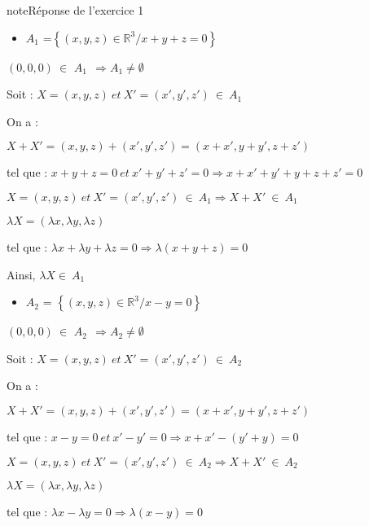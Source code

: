 \documentclass[letterpaper,10pt,french]{jupyterBook}
\begin{document}
\begin{sphinxadmonition}{note}{Réponse de l’exercice 1}
\begin{itemize}
\item {} 
\sphinxAtStartPar
\(A_1\) =\( \left\{ (x,y,z) \in \mathbb{R}^3 / x+y+z = 0 \right\}\)

\end{itemize}

\sphinxAtStartPar
\((0,0,0) ~\in\) \(A_1 ~~ \Rightarrow A_1 \neq  \emptyset\)

\sphinxAtStartPar
Soit :  \(X=(x,y,z) ~ et~ X'= (x',y',z') ~ \in ~A_1\)

\sphinxAtStartPar
On a :

\sphinxAtStartPar
\(X+ X' = (x,y,z) + (x',y',z') = (x+x',y+y',z+z')\)

\sphinxAtStartPar
tel que : \(x+y+z = 0 ~et~ x'+y'+z' = 0 \Rightarrow x+x'+y'+ y+ z +z' = 0 \)

\sphinxAtStartPar
\(X=(x,y,z) ~ et~ X'= (x',y',z') ~ \in ~A_1 \Rightarrow X+ X'~ \in ~A_1\)

\sphinxAtStartPar
\(\lambda X = (\lambda x, \lambda y,\lambda z)\)

\sphinxAtStartPar
tel que :
\(\lambda x+ \lambda y+ \lambda z = 0 \Rightarrow \lambda (x+y+z) = 0\)

\sphinxAtStartPar
Ainsi, \(\lambda X \in ~A_1\)
\begin{itemize}
\item {} 
\sphinxAtStartPar
\(A_2\) = \( \left\{ (x,y,z) \in \mathbb{R}^3 / x-y = 0 \right\}\)

\end{itemize}

\sphinxAtStartPar
\((0,0,0) ~\in\) \(A_2 ~~ \Rightarrow A_2 \neq  \emptyset\)

\sphinxAtStartPar
Soit :  \(X=(x,y,z) ~ et~ X'= (x',y',z') ~ \in ~A_2\)

\sphinxAtStartPar
On a :

\sphinxAtStartPar
\(X+ X' = (x,y,z) + (x',y',z') = (x+x',y+y',z+z')\)

\sphinxAtStartPar
tel que : \(x-y = 0 ~et~ x'-y' = 0 \Rightarrow x+x'-(y'+y) = 0 \)

\sphinxAtStartPar
\(X=(x,y,z) ~ et~ X'= (x',y',z') ~ \in ~A_2 \Rightarrow X+ X'~ \in ~A_2\)

\sphinxAtStartPar
\(\lambda X = (\lambda x, \lambda y,\lambda z)\)

\sphinxAtStartPar
tel que :
\(\lambda x- \lambda y = 0 \Rightarrow \lambda (x-y) = 0\)


\end{sphinxadmonition}
\end{document}

